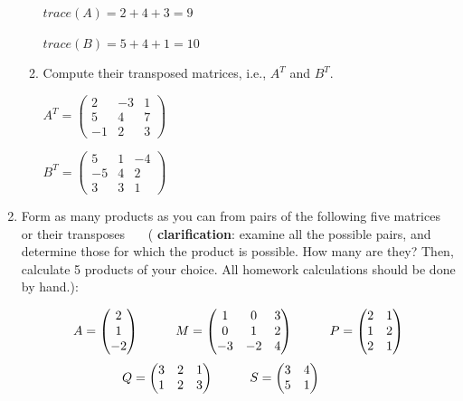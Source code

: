 \documentclass[fleqn]{article}
\begin{document}
\begin{enumerate}
\begin{enumerate}
  $
  trace(A)=2+4+3=9
  $
  
  $
  trace(B)=5+4+1=10
  $
  
  \item  Compute their transposed matrices, i.e., $A^T$ and $B^T$. 
  
  \noindent
  $A^T=
  \begin{pmatrix}
    2 & -3 & 1 \\
    5 & 4 & 7 \\
    -1 & 2 & 3
  \end{pmatrix}
  $
  
  \noindent
  $B^T=
  \begin{pmatrix}
    5 & 1 & -4 \\
    -5 & 4 & 2 \\
    3 & 3 & 1
  \end{pmatrix}
  $
  
  \end{enumerate}
  
  \item Form as many products as you can from pairs of the following five matrices or their transposes ~~~( {\bf clarification}: examine all the possible pairs, and determine those for which the product is possible. How many are they?  Then, calculate 5 products of your choice. All homework calculations should be done by hand.): 
  
  $$A=\begin{pmatrix}
    2  \\
    1  \\
    -2 
    \end{pmatrix} \hskip 1truecm M=\begin{pmatrix}
    1 & 0 & 3 \\
    0 & 1 & 2 \\
    -3 & -2 & 4
    \end{pmatrix}\hskip 1truecm P=\begin{pmatrix}
      2 & 1  \\
      1 & 2  \\
      2 & 1 
      \end{pmatrix}
    $$ 
    $$Q=\begin{pmatrix}
      3 & 2 & 1 \\
      1 & 2 & 3 \\
      \end{pmatrix} \hskip 1truecm S=\begin{pmatrix}
      3 & 4 \\
      5 & 1 \\
      \end{pmatrix}\hskip 1truecm
    $$ 


\end{enumerate}
\end{document}
